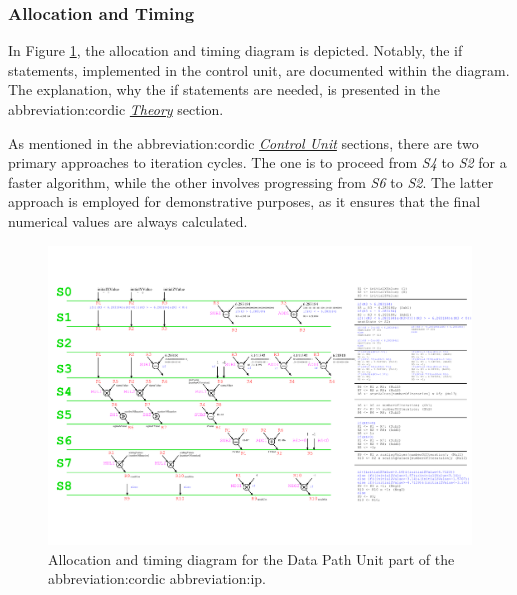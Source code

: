 \documentclass[a4paper, twoside, 11pt]{article}
\newcommand{\fbar}{\FloatBarrier}
\begin{document}
        \subsubsection{Allocation and Timing}
            In Figure \ref{fig:cordic-allocation-timing}, the allocation and timing diagram is depicted. Notably, the if statements, implemented in the control unit, are documented within the diagram. The explanation, why the if statements are needed, is presented in the \gls{abbreviation:cordic} \hyperref[subsec:cordic-theory]{\textit{Theory}} section.\par
            As mentioned in the \gls{abbreviation:cordic} \hyperref[subsubsec:cordic-control-unit]{\textit{Control Unit}} sections, there are two primary approaches to iteration cycles. The one is to proceed from \textit{S4} to \textit{S2} for a faster algorithm, while the other involves progressing from \textit{S6} to \textit{S2}. The latter approach is employed for demonstrative purposes, as it ensures that the final numerical values are always calculated.
            \begin{figure}[htbp!]
                \centering
                \includegraphics[width=1\textwidth]{src/pdf/cordic-allocation-timing.pdf}
                \caption{Allocation and timing diagram for the Data Path Unit part of the \gls{abbreviation:cordic} \gls{abbreviation:ip}.}
                \label{fig:cordic-allocation-timing}
            \end{figure}
        \fbar
\end{document}
